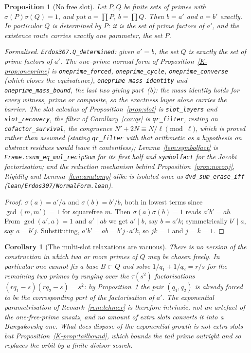 \documentclass[11pt]{article}
\newtheorem{proposition}[theorem]{Proposition}
\newtheorem{corollary}[theorem]{Corollary}
\theoremstyle{definition}
\begin{document}
\begin{proposition}[No free slot]\label{prop:nofreeslot}
Let $P,Q$ be finite sets of primes with $\sigma(P)\sigma(Q)=1$, and put $a=\prod P$, $b=\prod Q$.
Then $b=a'$ and $a=b'$ exactly. In particular $Q$ is \emph{determined} by $P$: it is the set of
prime factors of $a'$, and the existence route carries exactly one parameter, the set $P$.

\textup{Formalised.} \texttt{Erdos307.Q\_determined}: given $a'=b$, the set $Q$ is exactly the set of
prime factors of $a'$. The one--prime normal form of Proposition~\ref{K-prop:oneprime} is
\texttt{oneprime\_forced}, \texttt{oneprime\_cycle}, \texttt{oneprime\_converse}
\textup{(}which closes the equivalence\textup{)},
\texttt{oneprime\_mass\_identity} and \texttt{oneprime\_mass\_bound}, the last two giving
part~\textup{(b)}: the mass identity holds for
\emph{every} witness, prime or composite, so the exactness layer alone carries the barrier. The slot
calculus of Proposition~\ref{prop:slot} is \texttt{slot\_layers} and \texttt{slot\_recovery}, the
filter of Corollary~\ref{cor:qr} is \texttt{qr\_filter}, resting on \texttt{cofactor\_survival},
the congruence $N'+2N\equiv N/\ell\pmod\ell$, which is proved rather than assumed (stating \texttt{qr\_filter} with that arithmetic as a hypothesis on abstract residues would leave it contentless); Lemma~\ref{lem:symbolfact} is \texttt{Frame.csum\_eq\_mul\_recipSum} for its first half
and \texttt{symbolfact} for the Jacobi factorisation; and the reduction mechanism behind
Proposition~\ref{prop:noconj}, Rigidity and Lemma~\ref{lem:anatomy} alike is isolated once as
\texttt{dvd\_sum\_erase\_iff} \textup{(\texttt{lean/Erdos307/NormalForm.lean})}.
\end{proposition}
\begin{proof}
$\sigma(a)=a'/a$ and $\sigma(b)=b'/b$, both in lowest terms since $\gcd(m,m')=1$ for squarefree
$m$. Then $\sigma(a)\sigma(b)=1$ reads $a'b'=ab$. From $\gcd(a',a)=1$ and $a'\mid ab$ we get
$a'\mid b$, say $b=a'k$; symmetrically $b'\mid a$, say $a=b'j$. Substituting,
$a'b'=ab=b'j\cdot a'k$, so $jk=1$ and $j=k=1$.
\end{proof}

\begin{corollary}[The multi-slot relaxations are vacuous]\label{cor:noslack}
There is no version of the construction in which two or more primes of $Q$ may be chosen freely.
In particular one cannot fix a base $B\subset Q$ and solve $1/q_1+1/q_2=r/s$ for the remaining two
primes by ranging over the $\tau(s^2)$ factorisations $(rq_1-s)(rq_2-s)=s^2$: by
Proposition~\ref{prop:nofreeslot} the pair $(q_1,q_2)$ is already forced to be the corresponding
part of the factorisation of $a'$. The exponential parametrisation of
Remark~\textup{\ref{rem:lehmer}} is therefore intrinsic, not an artefact of the one-free-prime
ansatz, and no amount of extra slots converts it into a Bunyakovsky one. What does dispose of the
exponential growth is not extra slots but Proposition~\ref{K-prop:tailbound}, which bounds the tail
prime outright and so replaces the orbit by a finite divisor search.
\end{corollary}
\end{document}
